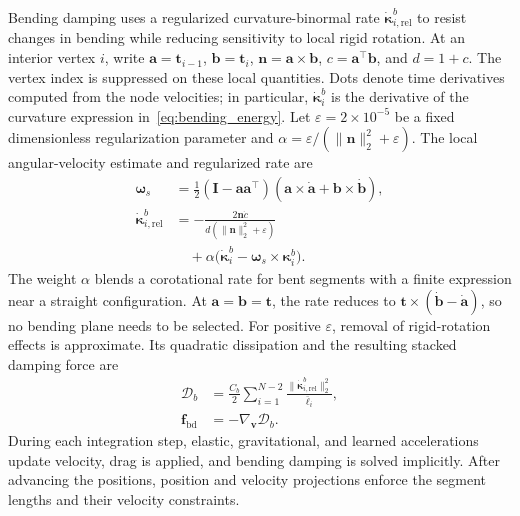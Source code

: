 \documentclass[letterpaper, 10 pt, conference]{ieeeconf}
\begin{document}
Bending damping uses a regularized curvature-binormal rate
$\dot{\boldsymbol\kappa}_{i,\mathrm{rel}}^b$ to resist changes in
bending while reducing sensitivity to local rigid rotation.
At an interior vertex $i$, write $\mathbf a=\mathbf t_{i-1}$,
$\mathbf b=\mathbf t_i$, $\mathbf n=\mathbf a\times\mathbf b$,
$c=\mathbf a^\top\mathbf b$, and $d=1+c$.
The vertex index is suppressed on these local quantities.
Dots denote time derivatives computed from the node velocities;
in particular, $\dot{\boldsymbol\kappa}_i^b$ is the derivative of
the curvature expression in~\eqref{eq:bending_energy}.
Let $\varepsilon=2\times10^{-5}$ be a fixed dimensionless
regularization parameter and
$\alpha=\varepsilon/(\|\mathbf n\|_2^2+\varepsilon)$.
The local angular-velocity estimate and regularized rate are
\begin{equation}
\begin{aligned}
\boldsymbol\omega_s
&=\tfrac12(\mathbf I-\mathbf a\mathbf a^\top)
(\mathbf a\times\dot{\mathbf a}+\mathbf b\times\dot{\mathbf b}),\\
\dot{\boldsymbol\kappa}_{i,\mathrm{rel}}^b
&=-\frac{2\mathbf n\dot c}{d(\|\mathbf n\|_2^2+\varepsilon)}\\
&\quad+\alpha\bigl(\dot{\boldsymbol\kappa}_i^b
-\boldsymbol\omega_s\times\boldsymbol\kappa_i^b\bigr).
\end{aligned}
\label{eq:regularized_bending_rate}
\end{equation}
The weight $\alpha$ blends a corotational rate for bent segments
with a finite expression near a straight configuration.
At $\mathbf a=\mathbf b=\mathbf t$, the rate reduces to
$\mathbf t\times(\dot{\mathbf b}-\dot{\mathbf a})$,
so no bending plane needs to be selected.
For positive $\varepsilon$, removal of rigid-rotation effects
is approximate.
Its quadratic dissipation and the resulting stacked damping force are
\begin{equation}
\begin{aligned}
\mathcal D_b
&=\frac{C_b}{2}\sum_{i=1}^{N-2}
\frac{\|\dot{\boldsymbol\kappa}_{i,\mathrm{rel}}^b\|_2^2}
{\bar\ell_i},\\
\mathbf f_{\mathrm{bd}}&=-\nabla_{\mathbf v}\mathcal D_b.
\end{aligned}
\label{eq:bending_damping}
\end{equation}
During each integration step, elastic, gravitational, and learned accelerations update
velocity, drag is applied, and bending damping is solved
implicitly. After advancing the positions, position and velocity
projections enforce the segment lengths and their velocity constraints.
\end{document}
